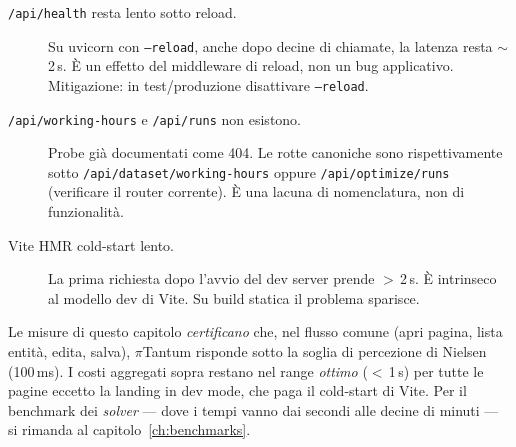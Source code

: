 \begin{description}
\item[\texttt{/api/health} resta lento sotto reload.]
  Su uvicorn con \texttt{--reload}, anche dopo decine di
  chiamate, la latenza resta $\sim$2\,s. \`E un effetto del
  middleware di reload, non un bug applicativo. Mitigazione:
  in test/produzione disattivare \texttt{--reload}.

\item[\texttt{/api/working-hours} e \texttt{/api/runs}
  non esistono.] Probe gi\`a documentati come 404. Le
  rotte canoniche sono rispettivamente sotto
  \texttt{/api/dataset/working-hours} oppure
  \texttt{/api/optimize/runs} (verificare il router
  corrente). \`E una lacuna di nomenclatura, non di
  funzionalit\`a.

\item[Vite HMR cold-start lento.] La prima richiesta dopo
  l'avvio del dev server prende $>\,$2\,s. \`E intrinseco al
  modello dev di Vite. Su build statica il problema sparisce.
\end{description}

\fleuron

Le misure di questo capitolo \emph{certificano} che, nel
flusso comune (apri pagina, lista entit\`a, edita, salva),
$\pi$Tantum risponde sotto la soglia di percezione di Nielsen
(100\,ms). I costi aggregati sopra restano nel range
\emph{ottimo} ($<\,$1\,s) per tutte le pagine eccetto la
landing in dev mode, che paga il cold-start di Vite. Per il
benchmark dei \emph{solver} --- dove i tempi vanno dai
secondi alle decine di minuti --- si rimanda al
capitolo~\ref{ch:benchmarks}.
